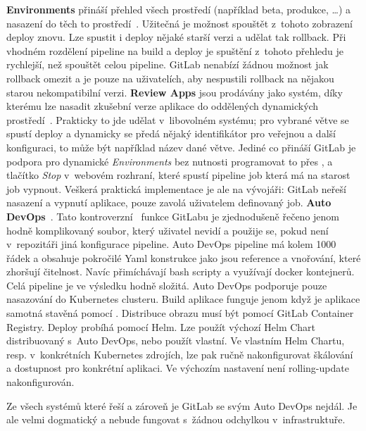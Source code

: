         \textbf{Environments} přináší přehled všech prostředí (například beta, produkce, \ldots) a nasazení do těch to prostředí~\cite{gitlab-environments}. Užitečná je možnost spouštět z~tohoto zobrazení deploy znovu. Lze spustit i deploy nějaké starší verzi a udělat tak rollback. Při vhodném rozdělení pipeline na build a deploy je spuštění z~tohoto přehledu je rychlejší, než spouštět celou pipeline. GitLab nenabízí žádnou možnost jak rollback omezit a je pouze na uživatelích, aby nespustili rollback na nějakou starou nekompatibilní verzi.\newline
        \textbf{Review Apps} jsou prodávány jako systém, díky kterému lze nasadit zkušební verze aplikace do oddělených dynamických prostředí~\cite{gitlab-review-apps}. Prakticky to jde udělat v~libovolném \CI systému; pro vybrané větve se spustí deploy a dynamicky se předá nějaký identifikátor pro veřejnou  a další konfiguraci, to může být například název dané větve. Jediné co přináší GitLab je podpora pro dynamické \textit{Environments} bez nutnosti programovat to přes , a tlačítko \textit{Stop} v~webovém rozhraní, které spustí pipeline job která má na starost job vypnout. Veškerá praktická implementace je ale na vývojáři: GitLab neřeší nasazení a vypnutí aplikace, pouze zavolá uživatelem definovaný job.\newline
        \textbf{Auto DevOps}~\cite{gitlab-auto-devops}. Tato kontroverzní~\cite{gitlab-auto-devops-forum} funkce GitLabu je zjednodušeně řečeno jenom hodně komplikovaný  soubor, který uživatel nevidí a použije se, pokud není v~repozitáři jiná konfigurace pipeline. Auto DevOps pipeline má kolem 1000 řádek a obsahuje pokročilé Yaml konstrukce jako jsou reference a vnořování, které zhoršují čitelnost. Navíc přimíchávají bash scripty a využívají docker kontejnerů. Celá pipeline je ve výsledku hodně složitá. Auto DevOps podporuje pouze nasazování do Kubernetes clusteru. Build aplikace funguje jenom když je aplikace samotná stavěná pomocí . Distribuce obrazu musí být pomocí GitLab Container Registry. Deploy probíhá pomocí Helm. Lze použít výchozí Helm Chart distribuovaný s~Auto DevOps, nebo použít vlastní. Ve vlastním Helm Chartu, resp. v~konkrétních Kubernetes zdrojích, lze pak ručně nakonfigurovat škálování a dostupnost pro konkrétní aplikaci. Ve výchozím nastavení není rolling-update nakonfigurován.

        Ze všech systémů které řeší \CI a zároveň \CD je GitLab se svým Auto DevOps nejdál. Je ale velmi dogmatický a nebude fungovat s~žádnou odchylkou v~infrastruktuře.

